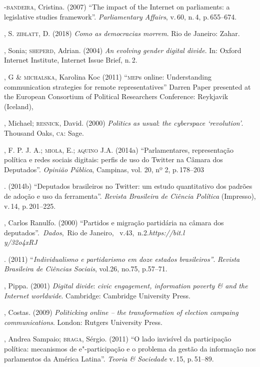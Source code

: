 \begin{bibliohedra}
-\textsc{bandeira}, Cristina. (2007) ``The impact of the Internet on
parliaments: a legislative studies framework''. \emph{Parliamentary
Affairs}, v.\,60, n.\,4, p.\,655--674.

, S. \textsc{ziblatt}, D. (2018) \emph{Como as democracias morrem}. Rio
de Janeiro: Zahar.

, Sonia; \textsc{sheperd}, Adrian. (2004) \emph{An evolving gender digital
divide}. In: Oxford Internet Institute, Internet Issue Brief, n.\,2.

, G \& \textsc{michalska}, Karolina Koc (2011) ``\textsc{mep}s online:
Understanding communication strategies for remote representatives''
Darren Paper presented at the European Consortium of Political
Researchers Conference: Reykjavik (Iceland),

, Michael; \textsc{resnick}, David. (2000) \emph{Politics as usual}:
\emph{the cyberspace `revolution'}. Thousand Oaks, \textsc{ca}: Sage.

, F. P. J. A.; \textsc{miola}, E.; \textsc{aquino} J.A. (2014a) ``Parlamentares,
representação política e redes sociais digitais: perfis de uso do
Twitter na Câmara dos Deputados''. \emph{Opinião Pública}, Campinas,
vol. 20, nº 2, p.\,178--203

\titidem. (2014b) ``Deputados
brasileiros no Twitter: um estudo quantitativo dos padrões de adoção e
uso da ferramenta''. \emph{Revista Brasileira de Ciência Política}
(Impresso), v.\,14, p.\,201--225.

, Carlos Ranulfo. (2000) ``Partidos e migração partidária na câmara
dos deputados''.~\emph{Dados},~Rio de Janeiro,~
v.43,~n.2.\emph{https://bit.l\\y/32o4xRJ}

\titidem. (2011) ``\emph{Individualismo e partidarismo em
doze estados brasileiros''}. \emph{Revista Brasileira de Ciências
Sociais}, vol.26, no.75, p.57--71.

, Pippa. (2001) \emph{Digital divide}: \emph{civic engagement,
information poverty \& and the Internet worldwide}. Cambridge: Cambridge
University Press.

, Costas. (2009) \emph{Politicking online -- the
transformation of election campaing communications}. London: Rutgers
University Press.

, Andrea Sampaio; \textsc{braga}, Sérgio. (2011) ``O lado invisível da
participação política: mecanismos de e"-participação e o problema da
gestão da informação nos parlamentos da América Latina''. \emph{Teoria
\& Sociedade} v.\,15, p.\,51--89.


\end{bibliohedra}
